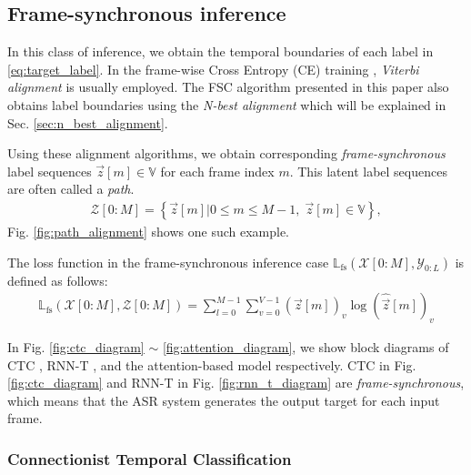 \documentclass{article}
\begin{document}
\subsection{Frame-synchronous inference}
\label{sec:frame_synchronous_inference}
In this class of inference,  we obtain
the temporal boundaries of each label in \eqref{eq:target_label}.
In the frame-wise Cross Entropy (CE) training 
\cite{g_hinton_ieee_signal_processing_mag_2012_00, 
C_Kim_INTERSPEECH_2017_1, 
B_Li_INTERSPEECH_2017_1}, {\it Viterbi alignment}  
\cite{
x_huang_prentice_hall_2001_00,
l_r_rabiner_proceedings_of_ieee_1989_00} is usually employed. 
The FSC algorithm presented in this paper also obtains
label boundaries using the {\it N-best alignment} which will
be explained in Sec. \ref{sec:n_best_alignment}.

Using these alignment algorithms, 
we obtain corresponding {\it frame-synchronous} label sequences 
$\vec{z}[m] \in \mathbb{V}$ for each frame index $m$. This
latent label sequences are often called a {\it path}.
  \begin{align}
    \mathcal{Z}[0:M]  =  
      \left\{\vec{z}[m]  \Big| 0 \le m \le M-1, \; \vec{z}[m] \in \mathbb{V} \right\}, 
    \label{eq:latent_label_seq}
  \end{align}
Fig. \ref{fig:path_alignment} shows one such example. 

The loss function in the frame-synchronous inference case
$\mathbb{L}_{\text{fs}}\left(\mathcal{X}[0:M], \mathcal{Y}_{0:L}\right)$ is 
defined as follows:
\begin{align}
  \mathbb{L}_{\text{fs}}\left(\mathcal{X}[0:M], \mathcal{Z}[0:M]\right) 
      = \sum_{l=0}^{M-1} 
          \sum_{v=0}^{V-1}  
            (\vec{z}[m])_v  
            \log (\widehat{\vec{z}}[m])_v  
        \label{eq:frame_synchronous_ce_loss} 
\end{align}


 In Fig. 
\ref{fig:ctc_diagram} $\sim$ \ref{fig:attention_diagram}, we show
block diagrams of CTC \cite{a_graves_icml_2006_00}, 
RNN-T \cite{a_graves_corr_2012_00, a_graves_icassp_2013_00}, and 
the attention-based model 
\cite{
j_chorowski_nips_2015_00,
w_chan_icassp_2016_00} respectively. CTC in Fig. \ref{fig:ctc_diagram} 
and RNN-T in Fig. \ref{fig:rnn_t_diagram} are {\it frame-synchronous}, 
which means that the ASR system generates the output target for each 
input frame.


\subsubsection{Connectionist Temporal Classification}
\label{sec:ctc}
\end{document}

